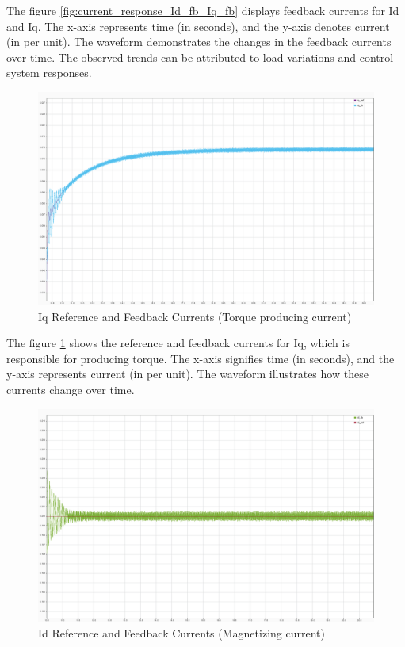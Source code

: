 The figure \ref{fig:current_response_Id_fb_Iq_fb} displays feedback currents for Id and Iq. The x-axis represents time (in seconds), and the y-axis denotes current (in per unit). The waveform demonstrates the changes in the feedback currents over time. The observed trends can be attributed to load variations and control system responses.



\begin{figure}[H]
	\centering
	\includegraphics[width=6in]{sections/section3/images/simulationResutls/Iq_ref_fb.png}
	\caption{Iq Reference and Feedback Currents (Torque producing current)}
	\label{fig:current_response_Iq_ref_fb}
\end{figure}

The figure \ref{fig:current_response_Iq_ref_fb} shows the reference and feedback currents for Iq, which is responsible for producing torque. The x-axis signifies time (in seconds), and the y-axis represents current (in per unit). The waveform illustrates how these currents change over time. 


\begin{figure}[H]
	\centering
	\includegraphics[width=6in]{sections/section3/images/simulationResutls/Id_ref_fb.png}
	\caption{Id Reference and Feedback Currents (Magnetizing current)}
	\label{fig:current_response_Id_ref_fb}
\end{figure}

